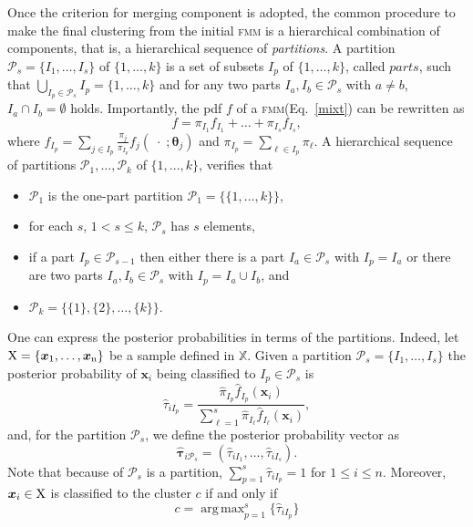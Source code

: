 \documentclass[10pt, a4paper]{article}
\DeclareMathOperator*{\argmax}{arg\,max}
\newcommand{\m}[1]{\boldsymbol{#1}}
\newcommand{\fmm}{\textsc{fmm}\xspace}
\begin{document}
\begin{spacing}{1.9}
Once the criterion for merging component is adopted, the common procedure to make the final clustering from the initial \fmm is a hierarchical combination of components, that is, a hierarchical sequence of \emph{partitions}. A partition $\mathcal{P}_s=\{ I_1, \dots, I_s\}$ of $\{1, \dots, k\}$ is a set of subsets $I_p$ of $\{1, \dots, k\}$, called $parts$, such that $\bigcup_{I_p \in \mathcal{P}_s} I_p = \{1, \dots, k\}$ and for any two parts $I_a, I_b \in \mathcal{P}_s$ with $a \neq b$, $I_a \cap I_b = \emptyset$ holds. Importantly, the pdf $f$ of a \fmm (Eq.~\ref{mixt}) can be rewritten as
\begin{equation}
f = \pi_{I_1} f_{I_1} + \dots + \pi_{I_s} f_{I_s},
\label{mixt_part}
\end{equation}
where $f_{I_p} = \sum_{j \in I_p} \frac{\pi_j}{\pi_{I_p}} f_j(\;\cdot\; ; \m\theta_j)$ and $\pi_{I_p} = \sum_{\ell \in I_p} \pi_\ell$. A hierarchical sequence of partitions $\mathcal{P}_1, \dots, \mathcal{P}_k$ of $\{1,...,k\}$, verifies that
  
\begin{itemize}
\item $\mathcal{P}_1$ is the one-part partition $\mathcal{P}_1 = \{ \{1, \dots, k\} \}$,
\item for each $s$, $1 <  s \leq k$, $\mathcal{P}_{s}$ has $s$ elements,
\item if a part $I_p \in \mathcal{P}_{s-1}$ then either there is a part $I_a \in \mathcal{P}_{s}$ with $I_p = I_a$ or there are two parts $I_a, I_b \in \mathcal{P}_s$ with $I_p = I_a \cup I_b$, and
\item $\mathcal{P}_k= \{ \{1\},\{2\}, \dots, \{k\} \}$.
\end{itemize}

One can express the posterior probabilities in terms of the partitions. Indeed, let $\rm X = \{\m x_1,\dots, \m x_n\}$ be a sample defined in $\mathbb{X}$. Given a partition $\mathcal{P}_s = \{ I_1, \dots, I_s \}$ the posterior probability of $\m x_i$ being classified to $I_p\in \mathcal{P}_{s}$ is
\[
\hat{\tau}_{i I_p} =  \frac{ \hat{\pi}_{I_p} \hat{f}_{I_p}(\m x_i) }{\sum_{\ell=1}^s \hat{\pi}_{I_\ell} \hat{f}_{I_\ell}(\m x_i)},
\]
and, for the partition  $\mathcal{P}_s$, we define the posterior probability vector as
\[
\hat{\m\tau}_{i \mathcal{P}_s} = \left( \hat{\tau}_{i I_1} , \dots, \hat{\tau}_{i I_s}  \right).
\]
Note that because of $\mathcal{P}_s$ is a partition, $\sum_{p=1}^s \hat{\tau}_{i I_p} = 1$ for $1 \leq i \leq n$.
Moreover, $\m x_i \in \rm X$ is classified to the cluster $c$ if and only if
\begin{equation}\label{cluster_criteria}
c= \argmax_{p=1}^s \{ \hat{\tau}_{i I_p} \}
\end{equation}



\end{spacing}
\end{document}
